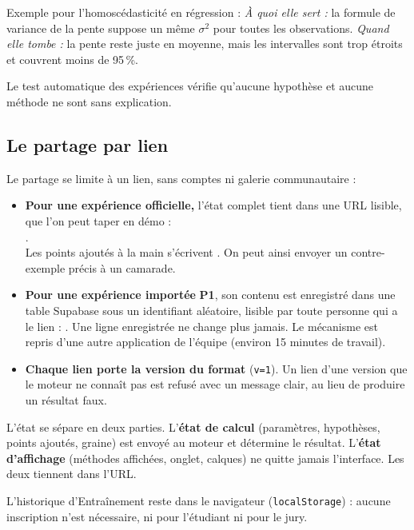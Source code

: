 \documentclass[11pt,a4paper]{article}
\newcommand{\pone}{\colorbox{ctMethod!18}{\footnotesize\textbf{P1}}}
\begin{document}
Exemple pour l'homoscédasticité en régression : \emph{À quoi elle sert :} la formule de variance de la pente suppose un même $\sigma^2$ pour toutes les observations. \emph{Quand elle tombe :} la pente reste juste en moyenne, mais les intervalles sont trop étroits et couvrent moins de 95\,\%.

Le test automatique des expériences vérifie qu'aucune hypothèse et aucune méthode ne sont sans explication.

\subsection{Le partage par lien}\label{sec:partage}
Le partage se limite à un lien, sans comptes ni galerie communautaire :
\begin{itemize}[leftmargin=*, nosep]
  \item \textbf{Pour une expérience officielle,} l'état complet tient dans une URL lisible, que l'on peut taper en démo :\\ .\\ Les points ajoutés à la main s'écrivent . On peut ainsi envoyer un contre-exemple précis à un camarade.
  \item \textbf{Pour une expérience importée} \pone{}, son contenu est enregistré dans une table Supabase sous un identifiant aléatoire, lisible par toute personne qui a le lien : . Une ligne enregistrée ne change plus jamais. Le mécanisme est repris d'une autre application de l'équipe (environ 15 minutes de travail).
  \item \textbf{Chaque lien porte la version du format} (\texttt{v=1}). Un lien d'une version que le moteur ne connaît pas est refusé avec un message clair, au lieu de produire un résultat faux.
\end{itemize}
L'état se sépare en deux parties. L'\textbf{état de calcul} (paramètres, hypothèses, points ajoutés, graine) est envoyé au moteur et détermine le résultat. L'\textbf{état d'affichage} (méthodes affichées, onglet, calques) ne quitte jamais l'interface. Les deux tiennent dans l'URL.

L'historique d'Entraînement reste dans le navigateur (\texttt{localStorage}) : aucune inscription n'est nécessaire, ni pour l'étudiant ni pour le jury.
\end{document}
